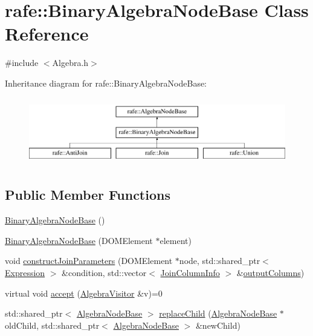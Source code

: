 \hypertarget{classrafe_1_1_binary_algebra_node_base}{\section{rafe\+:\+:Binary\+Algebra\+Node\+Base Class Reference}
\label{classrafe_1_1_binary_algebra_node_base}
}


{\ttfamily \#include $<$Algebra.\+h$>$}

Inheritance diagram for rafe\+:\+:Binary\+Algebra\+Node\+Base\+:\begin{figure}[H]
\begin{center}
\leavevmode
\includegraphics[height=2.962963cm]{classrafe_1_1_binary_algebra_node_base}
\end{center}
\end{figure}
\subsection*{Public Member Functions}
\begin{DoxyCompactItemize}
\item 
\hyperlink{classrafe_1_1_binary_algebra_node_base_a75ab2410e6296e01d27f500f250b6582}{Binary\+Algebra\+Node\+Base} ()
\item 
\hyperlink{classrafe_1_1_binary_algebra_node_base_a23b5bd89e39a5ee035a95aa7b4e1971c}{Binary\+Algebra\+Node\+Base} (D\+O\+M\+Element $\ast$element)
\item 
void \hyperlink{classrafe_1_1_binary_algebra_node_base_a614016d5d9dbf366eea5a4276c8e63b7}{construct\+Join\+Parameters} (D\+O\+M\+Element $\ast$node, std\+::shared\+\_\+ptr$<$ \hyperlink{classrafe_1_1_expression}{Expression} $>$ \&condition, std\+::vector$<$ \hyperlink{classrafe_1_1_join_column_info}{Join\+Column\+Info} $>$ \&\hyperlink{classrafe_1_1_algebra_node_base_aadae640fc5528efe6ce06c2171ba8075}{output\+Columns})
\item 
virtual void \hyperlink{classrafe_1_1_binary_algebra_node_base_a0c9c2fdbd7062bf0bf4587b9abc493b2}{accept} (\hyperlink{classrafe_1_1_algebra_visitor}{Algebra\+Visitor} \&v)=0
\item 
std\+::shared\+\_\+ptr$<$ \hyperlink{classrafe_1_1_algebra_node_base}{Algebra\+Node\+Base} $>$ \hyperlink{classrafe_1_1_binary_algebra_node_base_a7054bc98c4cca15927a326418e532d66}{replace\+Child} (\hyperlink{classrafe_1_1_algebra_node_base}{Algebra\+Node\+Base} $\ast$old\+Child, std\+::shared\+\_\+ptr$<$ \hyperlink{classrafe_1_1_algebra_node_base}{Algebra\+Node\+Base} $>$ \&new\+Child)
\end{DoxyCompactItemize}
